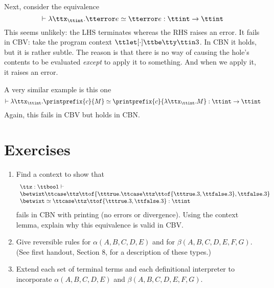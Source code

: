 \documentclass[runningheads,12pt]{llncs}
\begin{document}
Next, consider the equivalence
\begin{displaymath}
 \vdash  \lambda \ttx_{\ttint}. \tterror e \simeq \tterror e : \ttint \rightarrow \ttint
\end{displaymath}
This seems unlikely: the LHS terminates whereas the RHS raises an error.  It fails in CBV: take the program context $\ttlet [\cdot] \ttbe \tty \ttin 3$.  In CBN it holds, but it is rather subtle.  The reason is that there is no way of causing the hole's contents to be evaluated \emph{except} to apply it to something.  And when we apply it, it raises an error.  

A very similar example is this one
\begin{displaymath}
  \vdash \lambda \ttx_{\ttint}. \printprefix{c}{M} \simeq \printprefix{c}{\lambda \ttx_{\ttint}. M} : \ttint \rightarrow \ttint
\end{displaymath}
Again, this fails in CBV but holds in CBN.

\section{Exercises}

\begin{enumerate}
\item Find a context to show that 
  \begin{displaymath}
    \begin{array}{l}
    \ttz:\ttbool \vdash  \\
\betwixt \ttcase \ttz \ttof \{ \tttrue. \ttcase \ttz \ttof \{\tttrue. 3, \ttfalse. 3 \}, \ttfalse. 3 \} \\
\betwixt \simeq 
\ttcase \ttz \ttof \{ \tttrue. 3, \ttfalse. 3 \} : \ttint
\end{array}
  \end{displaymath}
fails in CBN with printing (no errors or divergence).  Using the context lemma, explain why this equivalence is valid in CBV.
\item Give reversible rules for $\alpha(A,B,C,D,E)$ and for $\beta(A,B,C,D,E,F,G)$.  (See first handout, Section 8, for a description of these types.)
\item Extend each set of terminal terms and each definitional interpreter to incorporate  $\alpha(A,B,C,D,E)$ and  $\beta(A,B,C,D,E,F,G)$.
\end{enumerate}
\end{document}
